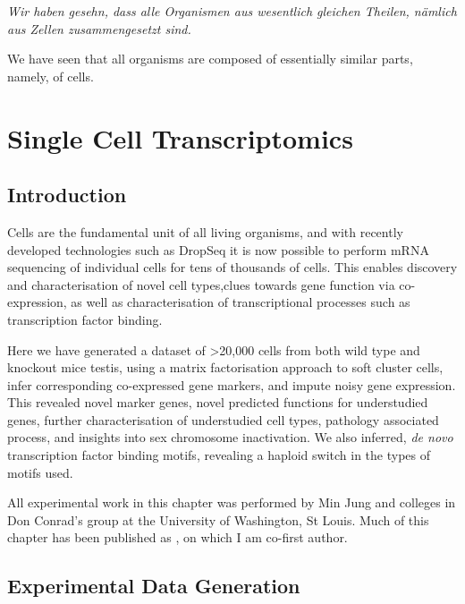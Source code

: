 \begin{savequote}[8cm]
	\textit{Wir haben gesehn, dass alle Organismen aus wesentlich gleichen Theilen, nämlich aus Zellen zusammengesetzt sind.}
	
	We have seen that all organisms are composed of essentially similar parts, namely, of cells.
\end{savequote}

\chapter{\label{ch:2-SDA} Single Cell Transcriptomics}

\minitoc

\section{Introduction}
Cells are the fundamental unit of all living organisms, and with recently developed technologies such as DropSeq it is now possible to perform mRNA sequencing of individual cells for tens of thousands of cells. This enables discovery and characterisation of novel cell types,clues towards gene function via co-expression, as well as characterisation of transcriptional processes such as transcription factor binding.

Here we have generated a dataset of >20,000 cells from both wild type and knockout mice testis, using a matrix factorisation approach to soft cluster cells, infer corresponding co-expressed gene markers, and impute noisy gene expression. This revealed novel marker genes, novel predicted functions for understudied genes, further characterisation of understudied cell types, pathology associated process, and insights into sex chromosome inactivation. We also inferred, \emph{de novo} transcription factor binding motifs, revealing a haploid switch in the types of motifs used.

\vspace{0.7cm}
\begin{framed}
\noindent All experimental work in this chapter was performed by Min Jung and colleges in Don Conrad's group at the University of Washington, St Louis. Much of this chapter has been published as \cite{Jung2019Unified}, on which I am co-first author.
\end{framed}

\section{Experimental Data Generation}

